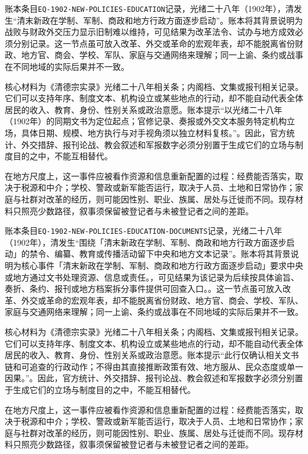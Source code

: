 账本条目\texttt{EQ-1902-NEW-POLICIES-EDUCATION}记录，光绪二十八年（1902年），清发生“清末新政在学制、军制、商政和地方行政方面逐步启动”。账本将其背景说明为战败与财政外交压力显示旧制难以维持，可见结果为改革法令、试办与地方成效必须分别记录。这一节点虽可放入改革、外交或革命的宏观年表，却不能脱离省份财政、地方官、商会、学校、军队、家庭与交通网络来理解；同一上谕、条约或战事在不同地域的实际后果并不一致。

核心材料为《清德宗实录》光绪二十八年相关条；内阁档、文集或报刊相关记录。它们可以支持年序、制度文本、机构设立或某些地点的行动，却不能自动代表全体居民的收入、教育、身份、性别关系或政治意愿。账本提示“以光绪二十八年（1902年）的同期文书为定位起点；官修记录、奏报或外交文本服务特定机构立场，具体日期、规模、地方执行与对手视角须以独立材料复核。”。因此，官方统计、外交措辞、报刊论战、教会叙述和军报数字必须分别置于生成它们的立场与制度目的之中，不能互相替代。

在地方尺度上，这一事件应被看作资源和信息重新配置的过程：经费能否落实，取决于税源和中介；学校、警政或新军能否运行，取决于人员、土地和日常协作；家庭与社群对改革的经历，则可能因性别、职业、族属、居处与迁徙而不同。现存材料只照亮少数路径，叙事须保留被登记者与未被登记者之间的差距。

账本条目\texttt{EQ-1902-NEW-POLICIES-EDUCATION-DOCUMENTS}记录，光绪二十八年（1902年），清发生“围绕「清末新政在学制、军制、商政和地方行政方面逐步启动」的禁令、编纂、教育或传播活动留下中央和地方文本记录”。账本将其背景说明为核心事件「清末新政在学制、军制、商政和地方行政方面逐步启动」要求中央或地方通过文书处理资源、信息或责任。，可见结果为该记录为后续按具体谕旨、奏折、条约、报刊或地方档案拆分事件提供可回查入口。。这一节点虽可放入改革、外交或革命的宏观年表，却不能脱离省份财政、地方官、商会、学校、军队、家庭与交通网络来理解；同一上谕、条约或战事在不同地域的实际后果并不一致。

核心材料为《清德宗实录》光绪二十八年相关条；内阁档、文集或报刊相关记录。它们可以支持年序、制度文本、机构设立或某些地点的行动，却不能自动代表全体居民的收入、教育、身份、性别关系或政治意愿。账本提示“此行仅确认相关文书链和可追查的行政动作；不得由其直接推断政策有效、地方服从、民众态度或单一因果。”。因此，官方统计、外交措辞、报刊论战、教会叙述和军报数字必须分别置于生成它们的立场与制度目的之中，不能互相替代。

在地方尺度上，这一事件应被看作资源和信息重新配置的过程：经费能否落实，取决于税源和中介；学校、警政或新军能否运行，取决于人员、土地和日常协作；家庭与社群对改革的经历，则可能因性别、职业、族属、居处与迁徙而不同。现存材料只照亮少数路径，叙事须保留被登记者与未被登记者之间的差距。

